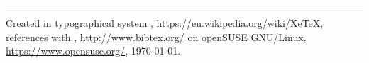 \documentclass[a4paper, 11pt, twoside]{article}
\begin{document}
\endgroup



\vfill
\hrule
\vfill
\begin{tiny}
  Created in typographical system , \url{https://en.wikipedia.org/wiki/XeTeX}, references with , \url{http://www.bibtex.org/} on openSUSE GNU/Linux, \url{https://www.opensuse.org/}, \today.
\end{tiny}
\end{document}
